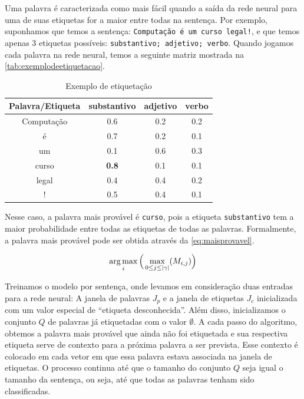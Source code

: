 Uma palavra é caracterizada como mais fácil quando a saída da rede neural para uma de suas etiquetas for a maior entre todas na sentença. Por exemplo, suponhamos que temos a sentença: \texttt{Computação é um curso legal!}, e que temos apenas 3 etiquetas possíveis: \texttt{substantivo; adjetivo; verbo}. Quando jogamos cada palavra na rede neural, temos a seguinte matriz mostrada na \autoref{tab:exemplodeetiquetacao}.


\begin{table}[!htb]
\caption{Exemplo de etiquetação} \label{tab:exemplodeetiquetacao}
\begin{center}
\begin{tabular}{c|c|c|c}
  \toprule
  Palavra/Etiqueta & substantivo & adjetivo & verbo \\
  \midrule
  Computação & 0.6 & 0.2 & 0.2 \\
  \midrule
  é          & 0.7 & 0.2 & 0.1 \\
  \midrule
  um         & 0.1 & 0.6 & 0.3 \\
  \midrule
  curso      & \textbf{0.8} & 0.1 & 0.1 \\
  \midrule
  legal      & 0.4 & 0.4 & 0.2 \\
  \midrule
  !          & 0.5 & 0.4 & 0.1 \\
  \bottomrule
\end{tabular}
\end{center}
\end{table}

Nesse caso, a palavra mais provável é \texttt{curso}, pois a etiqueta \texttt{substantivo} tem a maior probabilidade entre todas as etiquetas de todas as palavras. Formalmente, a palavra mais provável pode ser obtida através da \autoref{eq:maisprovavel}.

\begin{equation}\label{eq:maisprovavel}
\operatorname*{arg\,max}_{i}\Big(\max_{0 \leq j \leq |\gamma|}(M_{i,j})\Big)
\end{equation}

Treinamos o modelo por sentença, onde levamos em consideração duas entradas para a rede neural: A janela de palavras $J_p$ e a janela de etiquetas $J_c$ inicializada com um valor especial de ``etiqueta desconhecida''. Além disso, inicializamos o conjunto $Q$ de palavras já etiquetadas com o valor $\emptyset$. A cada passo do algoritmo, obtemos a palavra mais provável que ainda não foi etiquetada e sua respectiva etiqueta serve de contexto para a próxima palavra a ser prevista. Esse contexto é colocado em cada vetor em que essa palavra estava associada na janela de etiquetas. O processo continua até que o tamanho do conjunto $Q$ seja igual o tamanho da sentença, ou seja, até que todas as palavras tenham sido classificadas.

